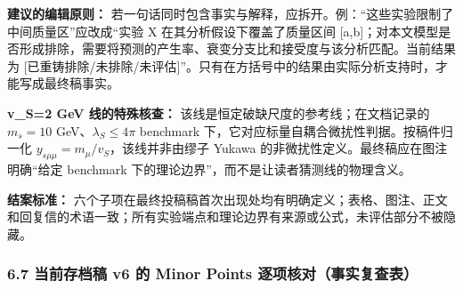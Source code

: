 \documentclass[
]{article}
\begin{document}
\textbf{建议的编辑原则：}
若一句话同时包含事实与解释，应拆开。例：``这些实验限制了中间质量区''应改成``实验
X 在其分析假设下覆盖了质量区间
{[}a,b{]}；对本文模型是否形成排除，需要将预测的产生率、衰变分支比和接受度与该分析匹配。当前结果为
{[}已重铸排除/未排除/未评估{]}''。只有在方括号中的结果由实际分析支持时，才能写成最终稿事实。

\textbf{v\_S=2 GeV 线的特殊核查：}
该线是恒定破缺尺度的参考线；在文档记录的 \(m_s=10\)
GeV、\(\lambda_S\le4\pi\) benchmark
下，它对应标量自耦合微扰性判据。按稿件归一化
\(y_{s\mu\mu}=m_\mu/v_S\)，该线并非由缪子 Yukawa
的非微扰性定义。最终稿应在图注明确``给定 benchmark
下的理论边界''，而不是让读者猜测线的物理含义。

\textbf{结案标准：}
六个子项在最终投稿稿首次出现处均有明确定义；表格、图注、正文和回复信的术语一致；所有实验端点和理论边界有来源或公式，未评估部分不被隐藏。

\subsubsection{6.7 当前存档稿 v6 的 Minor Points
逐项核对（事实复查表）}\label{ux5f53ux524dux5b58ux6863ux7a3f-v6-ux7684-minor-points-ux9010ux9879ux6838ux5bf9ux4e8bux5b9eux590dux67e5ux8868}
\end{document}
